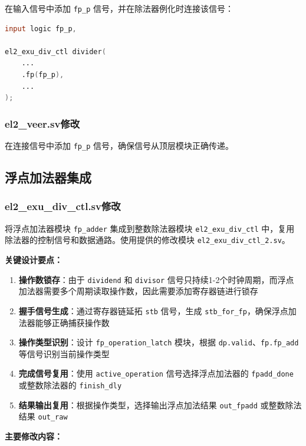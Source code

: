 \documentclass[12pt,a4paper]{article}
\begin{document}
在输入信号中添加 \texttt{fp\_p} 信号，并在除法器例化时连接该信号：
\begin{lstlisting}[language=Verilog]
input logic fp_p,

el2_exu_div_ctl divider(
    ...
    .fp(fp_p),
    ...
);
\end{lstlisting}

\subsubsection{el2\_veer.sv修改}

在连接信号中添加 \texttt{fp\_p} 信号，确保信号从顶层模块正确传递。

\subsection{浮点加法器集成}

\subsubsection{el2\_exu\_div\_ctl.sv修改}

将浮点加法器模块 \texttt{fp\_adder} 集成到整数除法器模块 \texttt{el2\_exu\_div\_ctl} 中，复用除法器的控制信号和数据通路。使用提供的修改模块 \texttt{el2\_exu\_div\_ctl\_2.sv}。

\textbf{关键设计要点：}

\begin{enumerate}[itemsep=0pt, parsep=3pt]
    \item \textbf{操作数锁存}：由于 \texttt{dividend} 和 \texttt{divisor} 信号只持续1-2个时钟周期，而浮点加法器需要多个周期读取操作数，因此需要添加寄存器链进行锁存
    \item \textbf{握手信号生成}：通过寄存器链延拓 \texttt{stb} 信号，生成 \texttt{stb\_for\_fp}，确保浮点加法器能够正确捕获操作数
    \item \textbf{操作类型识别}：设计 \texttt{fp\_operation\_latch} 模块，根据 \texttt{dp.valid}、\texttt{fp.fp\_add} 等信号识别当前操作类型
    \item \textbf{完成信号复用}：使用 \texttt{active\_operation} 信号选择浮点加法器的 \texttt{fpadd\_done} 或整数除法器的 \texttt{finish\_dly}
    \item \textbf{结果输出复用}：根据操作类型，选择输出浮点加法结果 \texttt{out\_fpadd} 或整数除法结果 \texttt{out\_raw}
\end{enumerate}

\textbf{主要修改内容：}
\end{document}
